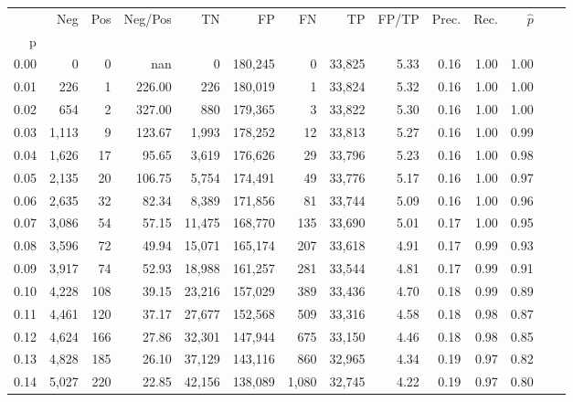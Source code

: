\begin{tabular}{rrrrrrrrrrrrrr}
\toprule
{} &    Neg &  Pos & Neg/Pos &       TN &       FP &      FN &      TP & FP/TP & Prec. &  Rec. & $\hat{p}$ \\
p    &        &      &         &          &          &         &         &       &       &       &           \\
\midrule
0.00 &      0 &    0 &     nan &        0 &  180,245 &       0 &  33,825 &  5.33 &  0.16 &  1.00 &      1.00 \\
0.01 &    226 &    1 &  226.00 &      226 &  180,019 &       1 &  33,824 &  5.32 &  0.16 &  1.00 &      1.00 \\
0.02 &    654 &    2 &  327.00 &      880 &  179,365 &       3 &  33,822 &  5.30 &  0.16 &  1.00 &      1.00 \\
0.03 &  1,113 &    9 &  123.67 &    1,993 &  178,252 &      12 &  33,813 &  5.27 &  0.16 &  1.00 &      0.99 \\
0.04 &  1,626 &   17 &   95.65 &    3,619 &  176,626 &      29 &  33,796 &  5.23 &  0.16 &  1.00 &      0.98 \\
0.05 &  2,135 &   20 &  106.75 &    5,754 &  174,491 &      49 &  33,776 &  5.17 &  0.16 &  1.00 &      0.97 \\
0.06 &  2,635 &   32 &   82.34 &    8,389 &  171,856 &      81 &  33,744 &  5.09 &  0.16 &  1.00 &      0.96 \\
0.07 &  3,086 &   54 &   57.15 &   11,475 &  168,770 &     135 &  33,690 &  5.01 &  0.17 &  1.00 &      0.95 \\
0.08 &  3,596 &   72 &   49.94 &   15,071 &  165,174 &     207 &  33,618 &  4.91 &  0.17 &  0.99 &      0.93 \\
0.09 &  3,917 &   74 &   52.93 &   18,988 &  161,257 &     281 &  33,544 &  4.81 &  0.17 &  0.99 &      0.91 \\
0.10 &  4,228 &  108 &   39.15 &   23,216 &  157,029 &     389 &  33,436 &  4.70 &  0.18 &  0.99 &      0.89 \\
0.11 &  4,461 &  120 &   37.17 &   27,677 &  152,568 &     509 &  33,316 &  4.58 &  0.18 &  0.98 &      0.87 \\
0.12 &  4,624 &  166 &   27.86 &   32,301 &  147,944 &     675 &  33,150 &  4.46 &  0.18 &  0.98 &      0.85 \\
0.13 &  4,828 &  185 &   26.10 &   37,129 &  143,116 &     860 &  32,965 &  4.34 &  0.19 &  0.97 &      0.82 \\
0.14 &  5,027 &  220 &   22.85 &   42,156 &  138,089 &   1,080 &  32,745 &  4.22 &  0.19 &  0.97 &      0.80 \\

\end{tabular}
